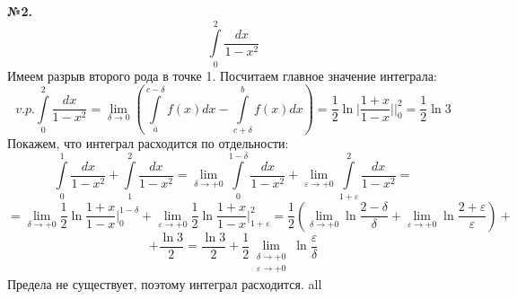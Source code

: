 \textbf{№2.} $$\int\limits_{0}^{2} \frac{dx}{1-x^2}$$ 
Имеем разрыв второго рода в точке 1. Посчитаем главное значение интеграла:
$$v.p.\int\limits_{0}^{2} \frac{dx}{1-x^2}=
\lim\limits_{\delta \to 0} \left( \int\limits_{a}^{c-\delta}f(x)dx -
\int\limits_{c+\delta}^{b}f(x)dx\right) = \frac{1}{2}\ln\bigg|
\frac{1+x}{1-x}\bigg|\Big|^2_0 = \frac{1}{2}\ln3
$$
Покажем, что интеграл расходится по отдельности:
$$\int\limits_{0}^{1}\frac{dx}{1-x^2}+\int\limits_{1}^{2}\frac{dx}{1-x^2}=
\lim\limits_{\delta \to +0} \int\limits_{0}^{1-\delta}\frac{dx}{1-x^2}+
\lim\limits_{\varepsilon\to +0} 
\int\limits_{1+\varepsilon}^{2}\frac{dx}{1-x^2}=
$$
$$=\lim\limits_{\delta \to +0}\frac{1}{2}\ln \frac{1+x}{1-x}\Big|^{1-\delta}_0
+\lim\limits_{\varepsilon \to +0}\frac{1}{2}\ln \frac{1+x}{1-x}
\Big|^2_{1+\varepsilon}=
\frac{1}{2}\left( \lim\limits_{\delta \to +0}\ln \frac{2-\delta}{\delta}+
\lim\limits_{\varepsilon \to +0}\ln \frac{2+\varepsilon}{\varepsilon}
\right)+
$$
$$+\frac{\ln3}{2}=\frac{\ln3}{2}+\frac{1}{2}
\lim\limits_{\substack{\delta \to+0\\
\varepsilon \to +0}} \ln\frac{\varepsilon}{\delta}$$
Предела не существует, поэтому интеграл расходится.
all









